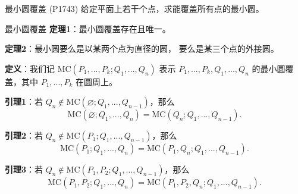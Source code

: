 \documentclass{beamer}
\begin{document}
\begin{frame}{最小圆覆盖 (P1743)}
    给定平面上若干个点，求能覆盖所有点的最小圆。
\end{frame}

\begin{frame}{最小圆覆盖}
    \footnotesize
    \textbf{定理1}：最小圆覆盖存在且唯一。

    \vspace{1em}\pause
    \textbf{定理2}：最小圆要么是以某两个点为直径的圆，
    要么是某三个点的外接圆。

    \vspace{1em}\pause
    \textbf{定义}：我们记 $\text{MC}(P_1,...,P_k;Q_1,...,Q_n)$ 表示
    $P_1,...,P_k,Q_1,...,Q_n$ 的最小圆覆盖，其中 $P_1,...,P_k$ 在圆周上。

    \vspace{1em}\pause
    \textbf{引理1}：若 $Q_n\notin \text{MC}(\varnothing;Q_1,...,Q_{n-1})$，那么
    \begin{equation*}
        \text{MC}(\varnothing;Q_1,...,Q_{n})=\text{MC}(Q_n;Q_1,...,Q_{n-1}).
    \end{equation*}

    \vspace{1em}\pause
    \textbf{引理2}：若 $Q_n\notin \text{MC}(P_1;Q_1,...,Q_{n-1})$，那么
    \begin{equation*}
        \text{MC}(P_1;Q_1,...,Q_{n})=\text{MC}(P_1,Q_n;Q_1,...,Q_{n-1}).
    \end{equation*}

    \vspace{1em}\pause
    \textbf{引理3}：若 $Q_n\notin \text{MC}(P_1,P_2;Q_1,...,Q_{n-1})$，那么
    \begin{equation*}
        \text{MC}(P_1,P_2;Q_1,...,Q_{n})=\text{MC}(P_1,P_2,Q_n;Q_1,...,Q_{n-1}).
    \end{equation*}
\end{frame}
\end{document}
